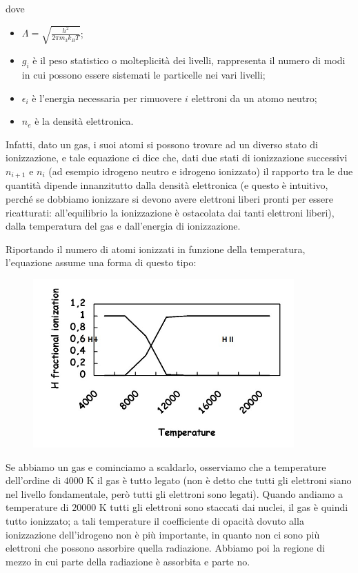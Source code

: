 dove

\begin{itemize}
  \item $\displaystyle \Lambda=\sqrt{\frac{h^2}{2 \pi m_3 k_B T}}$;
  \item $g_i$ è il peso statistico o molteplicità dei livelli, rappresenta il numero di modi in cui possono essere sistemati le particelle nei vari livelli;
  \item $\epsilon_i$ è l'energia necessaria per rimuovere $i$ elettroni da un atomo neutro;
  \item $n_e$ è la densità elettronica.
\end{itemize}

Infatti, dato un gas, i suoi atomi si possono trovare ad un diverso stato di ionizzazione, e tale equazione ci dice che, dati due stati di ionizzazione successivi $n_{i+1}$ e $n_i$ (ad esempio idrogeno neutro e idrogeno ionizzato) il rapporto tra le due quantità dipende innanzitutto dalla densità elettronica (e questo è intuitivo, perché se dobbiamo ionizzare si devono avere elettroni liberi pronti per essere ricatturati: all'equilibrio la ionizzazione è ostacolata dai tanti elettroni liberi), dalla temperatura del gas e dall'energia di ionizzazione.

Riportando il numero di atomi ionizzati in funzione della temperatura, l'equazione assume una forma di questo tipo:
  
\begin{figure}[H]
   \centering
   \includegraphics[width=10cm]{Saha_equation.jpg}
\end{figure}

Se abbiamo un gas e cominciamo a scaldarlo, osserviamo che a temperature dell'ordine di $4000$ K il gas è tutto legato (non è detto che tutti gli elettroni siano nel livello fondamentale, però tutti gli elettroni sono legati). Quando andiamo a temperature di $20000$ K tutti gli elettroni sono staccati dai nuclei, il gas è quindi tutto ionizzato; a tali temperature il coefficiente di opacità dovuto alla ionizzazione dell'idrogeno non è più importante, in quanto non ci sono più elettroni che possono assorbire quella radiazione. Abbiamo poi la regione di mezzo in cui parte della radiazione è assorbita e parte no.

